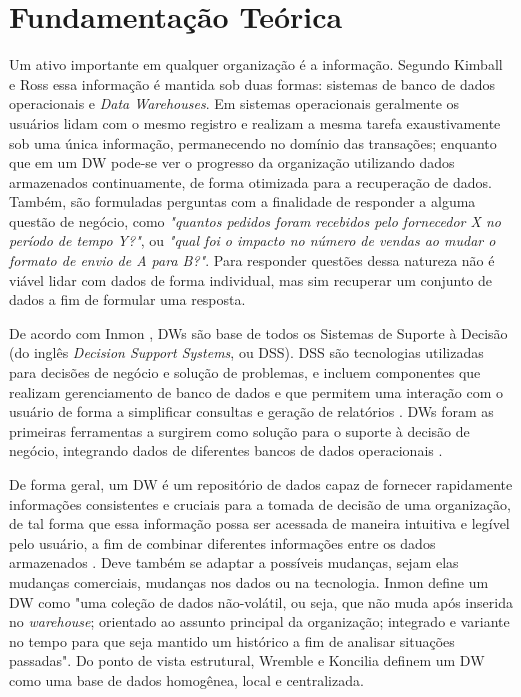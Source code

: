 \graphicspath{ {3-FUNDAMENTOS/} }

\chapter{Fundamentação Teórica}
\label{sgbd}

Um ativo importante em qualquer organização é a informação. Segundo Kimball e Ross \cite{kimball2002dw} essa informação é mantida sob duas formas: sistemas de banco de dados operacionais e \textit{Data Warehouses}. Em sistemas operacionais geralmente os usuários lidam com o mesmo registro e realizam a mesma tarefa exaustivamente sob uma única informação, permanecendo no domínio das transações; enquanto que em um DW pode-se ver o progresso da organização utilizando dados armazenados continuamente, de forma otimizada para a recuperação de dados. Também, são formuladas perguntas com a finalidade de responder a alguma questão de negócio, como \textit{"quantos pedidos foram recebidos pelo fornecedor X no período de tempo Y?"}, ou \textit{"qual foi o impacto no número de vendas ao mudar o formato de envio de A para B?"}. Para responder questões dessa natureza não é viável lidar com dados de forma individual, mas sim recuperar um conjunto de dados a fim de formular uma resposta.

De acordo com Inmon \cite{inmon2005building}, DWs são base de todos os Sistemas de Suporte à Decisão (do inglês \textit{Decision Support Systems}, ou DSS). DSS são tecnologias utilizadas para decisões de negócio e solução de problemas, 
e incluem componentes que realizam gerenciamento de banco de dados e que 
permitem uma interação com o usuário de forma a simplificar consultas e geração de relatórios 
\cite{shim2002past}. DWs foram as primeiras ferramentas a surgirem como solução para o 
suporte à decisão de negócio, integrando dados de diferentes bancos de dados operacionais 
\cite{inmon2005building, kimball2002dw}.

De forma geral, um DW é um repositório de dados capaz de fornecer rapidamente 
informações consistentes e cruciais para a tomada de decisão de uma organização, 
de tal forma que essa informação possa ser acessada de maneira intuitiva e legível 
pelo usuário, a fim de combinar diferentes informações entre os dados armazenados 
\cite{kimball2002dw}. Deve também se adaptar a possíveis mudanças, sejam elas mudanças comerciais, mudanças nos dados ou na tecnologia. Inmon \cite{inmon2005building} define um DW como "uma coleção de dados não-volátil, ou seja, que não muda após inserida no \textit{warehouse}; orientado ao assunto principal da organização; integrado e variante no tempo para que seja mantido um histórico a fim de analisar situações passadas". Do ponto de vista estrutural, Wremble e Koncilia \cite{wrembel2007data} definem um DW como uma base de dados homogênea, local e centralizada.

